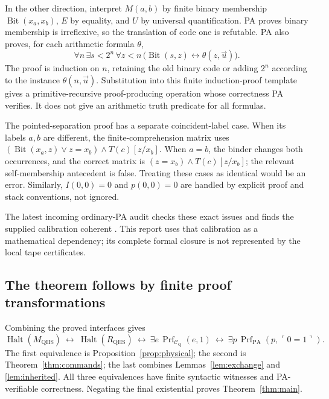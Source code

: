 \documentclass[11pt,letterpaper]{article}
\newcommand{\PA}{\mathrm{PA}}
\newcommand{\Prf}{\operatorname{Prf}}
\newcommand{\Halt}{\operatorname{Halt}}
\newcommand{\QHS}{M_{\mathrm{QHS}}}
\newcommand{\CQ}{\mathcal C_{\mathrm Q}}
\begin{document}
In the other direction, interpret $M(a,b)$ by finite binary membership
$\operatorname{Bit}(x_a,x_b)$, $E$ by equality, and $U$ by universal
quantification. PA proves binary membership is irreflexive, so the
translation of code one is refutable. PA also proves, for each
arithmetic formula $\theta$,
\[
 \forall n\,\exists s<2^n\,\forall z<n\,
  \bigl(\operatorname{Bit}(s,z)\leftrightarrow\theta(z,\vec u)\bigr).
\]
The proof is induction on $n$, retaining the old binary code or adding
$2^n$ according to the instance $\theta(n,\vec u)$. Substitution into
this finite induction-proof template gives a primitive-recursive
proof-producing operation whose correctness PA verifies. It does not
give an arithmetic truth predicate for all formulas.

The pointed-separation proof has a separate coincident-label case.
When its labels $a,b$ are different, the finite-comprehension matrix
uses $(\operatorname{Bit}(x_a,z)\lor z=x_b)\wedge T(c)[z/x_b]$.
When $a=b$, the binder changes both occurrences, and the correct
matrix is $(z=x_b)\wedge T(c)[z/x_b]$; the relevant self-membership
antecedent is false. Treating these cases as identical would be an
error. Similarly, $I(0,0)=0$ and $p(0,0)=0$ are handled by explicit
proof and stack conventions, not ignored.

The latest incoming ordinary-PA audit checks these exact issues and
finds the supplied calibration coherent \cite{audit}. This report
uses that calibration as a mathematical dependency; its complete
formal closure is not represented by the local tape certificates.

\subsection{The theorem follows by finite proof transformations}

Combining the proved interfaces gives
\[
 \Halt(\QHS)
 \ \longleftrightarrow\ \Halt(R_{\mathrm{QHS}})
 \ \longleftrightarrow\ \exists e\,\Prf_{\CQ}(e,1)
 \ \longleftrightarrow\ \exists p\,\Prf_{\PA}(p,\ulcorner0=1\urcorner).
\]
The first equivalence is Proposition~\ref{prop:physical}; the second
is Theorem~\ref{thm:commands}; the last combines
Lemmas~\ref{lem:exchange} and \ref{lem:inherited}. All three
equivalences have finite syntactic witnesses and PA-verifiable
correctness. Negating the final existential proves
Theorem~\ref{thm:main}.
\end{document}

